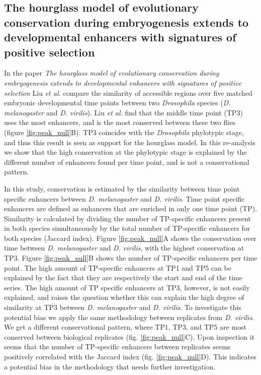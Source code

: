 \subsection{The hourglass model of evolutionary conservation during embryogenesis extends to developmental enhancers with signatures of positive selection} \label{subsection:liu}

In the paper \textit{The hourglass model of evolutionary conservation during embryogenesis extends to developmental enhancers with signatures of positive selection}\cite{Liu2021} Liu \textit{et al.} compare the similarity of accessible regions over five matched embryonic developmental time points between two \textit{Drosophila} species (\textit{D. melanogaster} and \textit{D. virilis}). Liu \textit{et al.} find that the middle time point (TP3) uses the most enhancers, and is the most conserved between these two flies (figure \ref{fig:peak_null}B). TP3 coincides with the \textit{Drosophila} phylotypic stage, and thus this result is seen as support for the hourglass model. In this re-analysis we show that the high conservation at the phylotypic stage is explained by the different number of enhancers found per time point, and is not a conservational pattern.

In this study, conservation is estimated by the similarity between time point specific enhancers between \textit{D. melanogaster} and \textit{D. virilis}. Time point specific enhancers are defined as enhancers that are enriched in only one time point (TP). Similarity is calculated by dividing the number of TP-specific enhancers present in both species simultaneously by the total number of TP-specific enhancers for both species (Jaccard index). Figure \ref{fig:peak_null}A shows the conservation over time between \textit{D. melanogaster} and \textit{D. virilis}, with the highest conservation at TP3. Figure \ref{fig:peak_null}B shows the number of  TP-specific enhancers per time point. The high amount of TP-specific enhancers at TP1 and TP5 can be explained by the fact that they are respectively the start and end of the time series. The high amount of TP specific enhancers at TP3, however, is not easily explained, and raises the question whether this can explain the high degree of similarity at TP3 between \textit{D. melanogaster} and \textit{D. virilis}. To investigate this potential bias we apply the same methodology between replicates from \textit{D. virilis}. We get a different conservational pattern, where TP1, TP3, and TP5 are most conserved between biological replicates (fig. \ref{fig:peak_null}C). Upon inspection it seems that the number of TP-specific enhancers between replicates seems positively correlated with the Jaccard index (fig. \ref{fig:peak_null}D). This indicates a potential bias in the methodology that needs further investigation.

